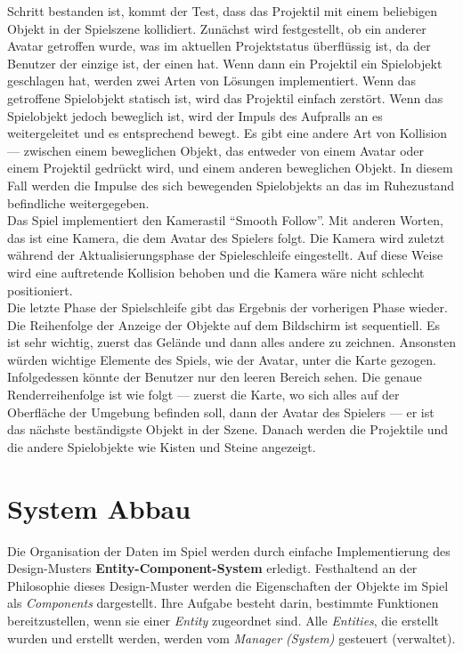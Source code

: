 \documentclass[
  10pt,
  a4paper,
  oneside,
  headers,
  headinclude,
  footinclude,
  BCOR5mm,
]{article}
\begin{document}
Schritt bestanden ist, kommt der Test, dass das Projektil mit einem beliebigen
Objekt in der Spielszene kollidiert. Zunächst wird festgestellt, ob ein anderer
Avatar getroffen wurde, was im aktuellen Projektstatus überflüssig ist, da der
Benutzer der einzige ist, der einen hat. Wenn dann ein Projektil ein Spielobjekt
geschlagen hat, werden zwei Arten von Lösungen implementiert. Wenn das
getroffene Spielobjekt statisch ist, wird das Projektil einfach zerstört. Wenn
das Spielobjekt jedoch beweglich ist, wird der Impuls des Aufpralls an es
weitergeleitet und es entsprechend bewegt. Es gibt eine andere Art von Kollision
--- zwischen einem beweglichen Objekt, das entweder von einem Avatar oder einem
Projektil gedrückt wird, und einem anderen beweglichen Objekt. In diesem Fall
werden die Impulse des sich bewegenden Spielobjekts an das im Ruhezustand
befindliche weitergegeben. \\
Das Spiel implementiert den Kamerastil ``Smooth Follow''. Mit anderen Worten,
das ist eine Kamera, die dem Avatar des Spielers folgt. Die Kamera wird zuletzt
während der Aktualisierungsphase der Spieleschleife eingestellt. Auf diese Weise
wird eine auftretende Kollision behoben und die Kamera wäre nicht schlecht
positioniert. \\
Die letzte Phase der Spielschleife gibt das Ergebnis der vorherigen Phase
wieder. Die Reihenfolge der Anzeige der Objekte auf dem Bildschirm ist
sequentiell. Es ist sehr wichtig, zuerst das Gelände und dann alles andere zu
zeichnen. Ansonsten würden wichtige Elemente des Spiels, wie der Avatar, unter
die Karte gezogen. Infolgedessen könnte der Benutzer nur den leeren Bereich
sehen. Die genaue Renderreihenfolge ist wie folgt --- zuerst die Karte, wo sich
alles auf der Oberfläche der Umgebung befinden soll, dann der Avatar des
Spielers --- er ist das nächste beständigste Objekt in der Szene. Danach werden
die Projektile und die andere Spielobjekte wie Kisten und Steine angezeigt. \\

\section{System Abbau}
Die Organisation der Daten im Spiel werden durch einfache Implementierung des
Design-Musters \textbf{Entity-Component-System} erledigt. Festhaltend an der
Philosophie dieses Design-Muster werden die Eigenschaften der Objekte im Spiel
als \textit{Components} dargestellt. Ihre Aufgabe besteht darin, bestimmte
Funktionen bereitzustellen, wenn sie einer \textit{Entity} zugeordnet sind.
Alle \textit{Entities}, die erstellt wurden und erstellt werden, werden vom
\textit{Manager (System)} gesteuert (verwaltet). \\
\end{document}
